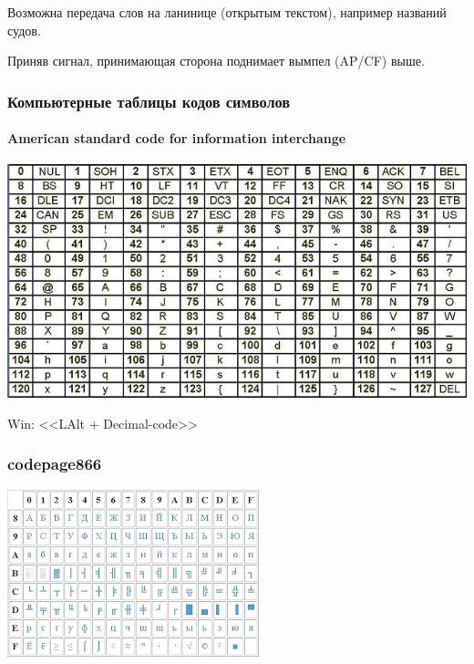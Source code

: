 Возможна передача слов на ланинице (открытым текстом), например названий судов.

Приняв сигнал, принимающая сторона поднимает вымпел (AP/CF) выше.

\begin{frame}
    \frametitle{Компьютерные таблицы кодов символов}
    \framesubtitle{American standard code for information interchange}
    
    \begin{center}
        \includegraphics[width=.95\textwidth]{fig/ASCII}
    \end{center}
    Win: <<LAlt + Decimal-code>>
\end{frame}

\begin{frame}
    \frametitle{codepage866}
    
    \begin{center}
        \includegraphics[width=.95\textwidth]{fig/cp866}
    \end{center}
\end{frame}

